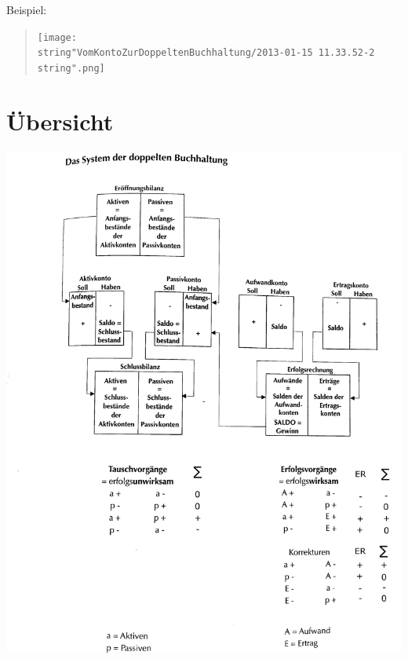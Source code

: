 Beispiel:
\begin{verse}
\texttt{[image: \\string"VomKontoZurDoppeltenBuchhaltung/2013-01-15 11.33.52-2\\string".png]}
\end{verse}

\section*{Übersicht}

\includegraphics[width=17cm]{VomKontoZurDoppeltenBuchhaltung/DoppelteBuchhaltung}
